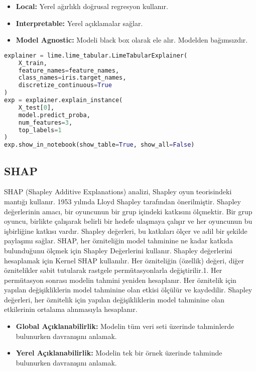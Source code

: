\begin{itemize}
    \item \textbf{Local:} Yerel ağırlıklı doğrusal regresyon kullanır.
    \item \textbf{Interpretable:} Yerel açıklamalar sağlar.
    \item \textbf{Model Agnostic:} Modeli black box olarak ele alır. Modelden bağımsızdır.
\end{itemize}

\begin{lstlisting}[language=Python]
explainer = lime.lime_tabular.LimeTabularExplainer(
	X_train, 
	feature_names=feature_names, 
	class_names=iris.target_names, 
	discretize_continuous=True
)
exp = explainer.explain_instance(
	X_test[0], 
	model.predict_proba, 
	num_features=3, 
	top_labels=1
)
exp.show_in_notebook(show_table=True, show_all=False)
\end{lstlisting}

\subsection{SHAP}
SHAP (Shapley Additive Explanations) analizi, Shapley oyun teorisindeki mantığı kullanır. 1953 yılında Lloyd Shapley tarafından önerilmiştir. Shapley değerlerinin amacı, bir oyuncunun bir grup içindeki katkısını ölçmektir. Bir grup oyuncu, birlikte çalışarak belirli bir hedefe ulaşmaya çalışır ve her oyuncunun bu işbirliğine katkısı vardır. Shapley değerleri, bu katkıları ölçer ve adil bir şekilde paylaşımı sağlar. SHAP, her özniteliğin model tahminine ne kadar katkıda bulunduğunu ölçmek için Shapley Değerlerini kullanır. Shapley değerlerini hesaplamak için Kernel SHAP kullanılır. Her özniteliğin (özellik) değeri, diğer öznitelikler sabit tutularak rastgele permütasyonlarla değiştirilir.1. Her permütasyon sonrası modelin tahmini yeniden hesaplanır. Her öznitelik için yapılan değişikliklerin model tahminine olan etkisi ölçülür ve kaydedilir. Shapley değerleri, her öznitelik için yapılan değişikliklerin model tahminine olan etkilerinin ortalama alınmasıyla hesaplanır.

\begin{itemize}
    \item \textbf{Global Açıklanabilirlik:} Modelin tüm veri seti üzerinde tahminlerde bulunurken davranışını anlamak.
    \item \textbf{Yerel Açıklanabilirlik:} Modelin tek bir örnek üzerinde tahminde bulunurken davranışını anlamak.
\end{itemize}

